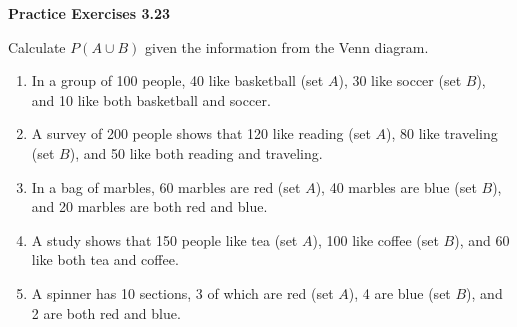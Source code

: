 \vspace{0.3ex}
\noindent\textbf{Practice Exercises 3.23}

\vspace{0.2ex}

Calculate \( P(A \cup B) \) given the information from the Venn diagram.

\begin{enumerate}[label=\color{blue}\arabic*.]
    \item In a group of 100 people, 40 like basketball (set \( A \)), 30 like soccer (set \( B \)), and 10 like both basketball and soccer.  
    \item A survey of 200 people shows that 120 like reading (set \( A \)), 80 like traveling (set \( B \)), and 50 like both reading and traveling.  
    \item In a bag of marbles, 60 marbles are red (set \( A \)), 40 marbles are blue (set \( B \)), and 20 marbles are both red and blue.  
    \item A study shows that 150 people like tea (set \( A \)), 100 like coffee (set \( B \)), and 60 like both tea and coffee.  
    \item A spinner has 10 sections, 3 of which are red (set \( A \)), 4 are blue (set \( B \)), and 2 are both red and blue.  
\end{enumerate}
